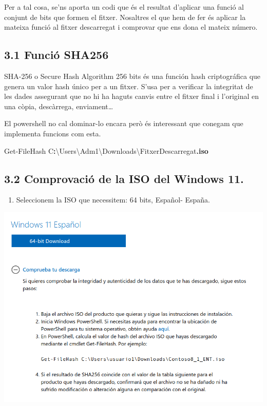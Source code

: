 \documentclass[
  a4paper,
]{article}
\newenvironment{Shaded}{\begin{snugshade}}{\end{snugshade}}
\newcommand{\FunctionTok}[1]{\textcolor[rgb]{0.13,0.29,0.53}{\textbf{#1}}}
\newcommand{\NormalTok}[1]{#1}
\newcommand{\OperatorTok}[1]{\textcolor[rgb]{0.81,0.36,0.00}{\textbf{#1}}}
\providecommand{\tightlist}{%
  \setlength{\itemsep}{0pt}\setlength{\parskip}{0pt}}
\begin{document}
Per a tal cosa, se'ns aporta un codi que és el resultat d'aplicar una
funció al conjunt de bits que formen el fitxer. Nosaltres el que hem de
fer és aplicar la mateixa funció al fitxer descarregat i comprovar que
ens dona el mateix número.

\subsection{3.1 Funció SHA256}\label{funciuxf3-sha256}

SHA-256 o Secure Hash Algorithm 256 bits és una función hash
criptográfica que genera un valor hash único per a un fitxer. S'usa per
a verificar la integritat de les dades assegurant que no hi ha haguts
canvis entre el fitxer final i l'original en una còpia, descàrrega,
enviament\ldots{}

El powershell no cal dominar-lo encara però és interessant que conegam
que implementa funcions com esta.

\begin{Shaded}
\begin{Highlighting}[]
\NormalTok{Get{-}FileHash C}\OperatorTok{:}\NormalTok{\textbackslash{}Users\textbackslash{}Adm1\textbackslash{}Downloads\textbackslash{}FitxerDescarregat}\OperatorTok{.}\FunctionTok{iso}
\end{Highlighting}
\end{Shaded}

\subsection{3.2 Comprovació de la ISO del Windows
11.}\label{comprovaciuxf3-de-la-iso-del-windows-11.}

\begin{enumerate}
\def\labelenumi{\arabic{enumi}.}
\tightlist
\item
  Seleccionem la ISO que necessitem: 64 bits, Español- España.
\end{enumerate}

\includegraphics{png/comprobarSHA1.png}
\end{document}
